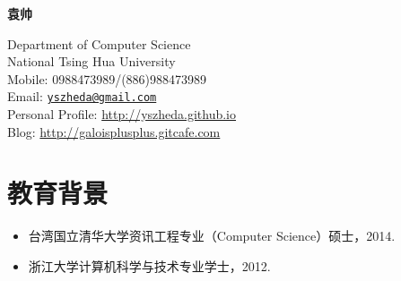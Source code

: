 \documentclass[letterpaper]{article}
\def\name{袁帅}
\begin{document}
\centerline{\huge\bf \name} \vspace{0.25in}
\begin{minipage}[t]{0.8\textwidth}
Department of Computer Science \\
National Tsing Hua University \\
Mobile: 0988473989/(886)988473989   \\
Email: \href{mailto:yszheda@gmail.com}{\tt yszheda@gmail.com}\\
Personal Profile: \url{http://yszheda.github.io} \\
Blog: \url{http://galoisplusplus.gitcafe.com}
\end{minipage}

\section*{教育背景}
\begin{itemize}
\item 台湾国立清华大学资讯工程专业（Computer Science）硕士，2014.
\item 浙江大学计算机科学与技术专业学士，2012.
\end{itemize}
\end{document}
